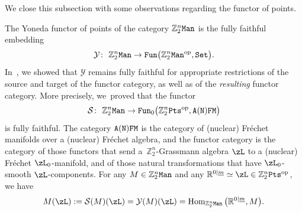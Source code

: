 \documentclass[10pt,a4paper]{amsart}
\newcommand{\op}[1]{\operatorname{#1}}
\newcommand{\R}{{\mathbb R}}
\newcommand{\Z}{{\mathbb Z}}
\def\ul{\underline}
\def\ul{\underline}
\newcommand{\0}{\otimes}
\newcommand{\z}{\Z_2^n}
\numberwithin{equation}{section}
\begin{document}
We close this subsection with some observations regarding the functor of points.

The Yoneda functor of points of the category $\z\tt Man$ is the fully faithful embedding
\[
\mathcal{Y}\colon\ \z{\tt Man}\to {\tt Fun}\big(\z{\tt Man}^{\op{op}},{\tt Set}\big).
\]
In~\cite{Bruce:2019b}, we showed that $\mathcal Y$ remains fully faithful for appropriate restrictions of the source and target of the functor category, as well as of the {\it resulting} functor category. More precisely, we~proved that the functor
\begin{gather}\label{SVYoneda}
\mathcal{S}\colon\ \z{\tt Man}\to{\tt Fun}_0\big(\z{\tt Pts}^{\op{op}},\tt A(N)FM\big)
\end{gather}
is fully faithful. The category $\tt A(N)FM$ is the category of (nuclear) Fr\'echet manifolds over a (nuc\-lear) Fr\'echet algebra, and the functor category is the category of those functors that send a~$\z$-Grassmann algebra $\zL$ to a (nuclear) Fr\'echet $\zL_0$-manifold, and of those natural transformations that have $\zL_0$-smooth $\zL$-components. For any $M\in\z\tt Man$ and any $\R^{0|\ul m}\simeq\zL\in\z{\tt Pts}^{\op{op}}$, we have
\[
M(\zL):=\mathcal{S}(M)(\zL)=\mathcal{Y}(M)(\zL)=\op{Hom}_{\z\tt Man}\big(\R^{0|\ul m},M\big).
\]
\end{document}
